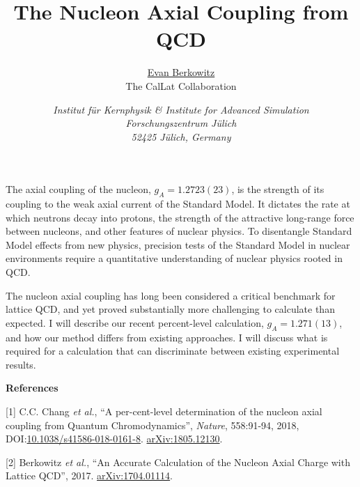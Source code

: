 \documentclass[a4paper,12pt]{article}                               %
\begin{document}
\title{The Nucleon Axial Coupling from QCD}

\author{\underline{Evan Berkowitz}\\ The CalLat Collaboration}
\date{\small \it
    Institut f\"{u}r Kernphysik \& Institute for Advanced Simulation \\ Forschungszentrum J\"{u}lich \\ 52425 J\"{u}lich, Germany
}

\maketitle

The axial coupling of the nucleon, $g_A=1.2723(23)$, is the strength of its coupling to the weak axial current of the Standard Model.
It dictates the rate at which neutrons decay into protons, the strength of the attractive long-range force between nucleons, and other features of nuclear physics.
To disentangle Standard Model effects from new physics, precision tests of the Standard Model in nuclear environments require a quantitative understanding of nuclear physics rooted in QCD.

The nucleon axial coupling has long been considered a critical benchmark for lattice QCD, and yet proved substantially more challenging to calculate than expected.
I will describe our recent percent-level calculation, $g_A=1.271(13)$, and how our method differs from existing approaches.
I will discuss what is required for a calculation that can discriminate between existing experimental results.


\vspace{32pt}
{\large \bf References}

\setlength{\parindent}{0cm}
\setlength{\parskip}{16pt}
[1] C.C. Chang \emph{et al.}, ``A per-cent-level determination of the nucleon axial coupling from Quantum Chromodynamics'', \emph{Nature}, 558:91-94, 2018, DOI:\href{https://doi.org/10.1038/s41586-018-0161-8}{10.1038/s41586-018-0161-8}.  \href{https://arxiv.org/abs/1805.12130}{arXiv:1805.12130}.

[2] Berkowitz \emph{et al.}, ``An Accurate Calculation of the Nucleon Axial Charge with Lattice QCD'', 2017.  \href{https://arxiv.org/abs/1704.01114}{arXiv:1704.01114}.

%
% 
% 
\end{document}
